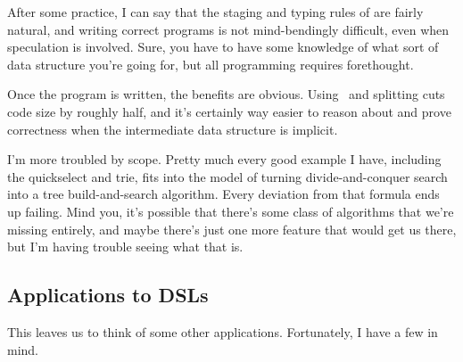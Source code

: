 After some practice, I can say that the staging and typing rules of \lang are fairly natural, 
and writing correct programs is not mind-bendingly difficult, even when speculation is involved.
Sure, you have to have some knowledge of what sort of data structure you're going for,
but all programming requires forethought.

Once the program is written, the benefits are obvious.
Using \lang\ and splitting cuts code size by roughly half,
and it's certainly way easier to reason about and prove correctness when the intermediate data structure is implicit.

I'm more troubled by scope.  
Pretty much every good example I have, including the quickselect and trie, fits into the model of turning
divide-and-conquer search into a tree build-and-search algorithm.  
Every deviation from that formula ends up failing.
Mind you, it's possible that there's some class of algorithms that we're missing entirely, 
and maybe there's just one more feature that would get us there,
but I'm having trouble seeing what that is.

\subsection {Applications to DSLs}

This leaves us to think of some other applications.  Fortunately, I have a few in mind.
